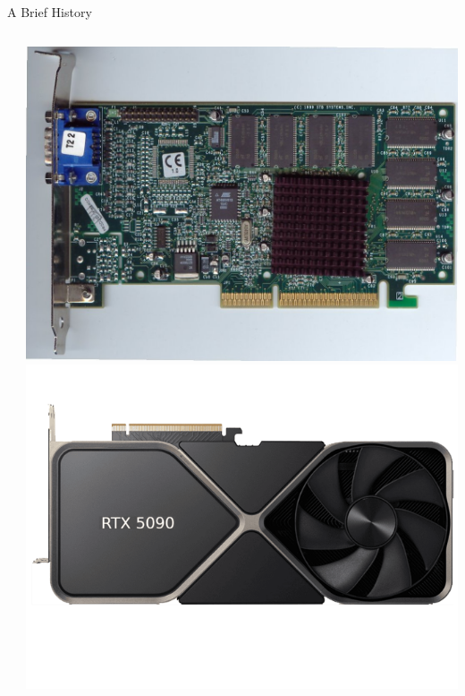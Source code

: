 \begin{frame}{A Brief History}
\begin{columns}
\begin{column}{0.6\textwidth}
\begin{timeline}
      \end{timeline}
    \end{column}
    \begin{column}{0.4\textwidth}
      \small
      \begin{center}
        \includegraphics[width=0.8\linewidth]{images/vodoo3.jpg}
        \vspace{0.1cm}
        \includegraphics[width=0.8\linewidth]{images/5090.png}
        \vspace*{-0.5cm}
      \end{center}

      \vspace{1.5cm}

    \end{column}
  \end{columns}
\end{frame}

